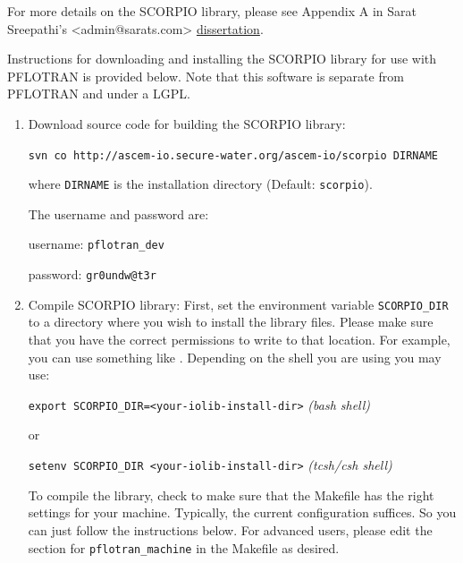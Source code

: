 {For more details on the SCORPIO library, please see Appendix A in Sarat Sreepathi's \linebreak <admin@sarats.com> \href{http://www.lib.ncsu.edu/resolver/1840.16/8317}{dissertation}.

Instructions for downloading and installing the SCORPIO library for use with PFLOTRAN is provided below. Note that this software is separate from PFLOTRAN and under a LGPL.
\begin{enumerate}

\item Download source code for building the SCORPIO library:

{\small\texttt{svn co http://ascem-io.secure-water.org/ascem-io/scorpio DIRNAME}}

where {\footnotesize\texttt{DIRNAME}} is the installation directory (Default: {\footnotesize\texttt{scorpio}}). 

The username and password are:

username: {\footnotesize\texttt{pflotran\_dev}}

password: {\footnotesize\texttt{gr0undw@t3r}}

\item Compile SCORPIO library:
First, set the environment variable {\footnotesize\tt SCORPIO\_DIR} to a directory where you wish to install the library files. 
Please make sure that you have the correct permissions to write to that location. For example, you can use something like .
Depending on the shell you are using you may use:

\footnotesize {\tt export SCORPIO\_DIR=<your-iolib-install-dir>} \hfill {\it (bash shell)}
\normalsize

or

\footnotesize
{\tt setenv SCORPIO\_DIR <your-iolib-install-dir>} \hfill {\it (tcsh/csh shell)}

\normalsize

To compile the library, check to make sure that the Makefile has the right settings for your machine.
Typically, the current configuration suffices. So you can just follow the instructions below.
For advanced users, please edit the section for {\footnotesize\tt pflotran\_machine} in the Makefile as desired.


\end{enumerate}}
